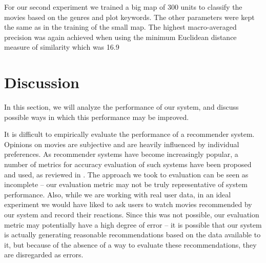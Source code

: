 \documentclass[conference]{IEEEtran}
\begin{document}
For our second experiment we trained a big map of 300 units to classify the movies based on the genres and plot keywords. The other parameters were kept the same as in the training of the small map. The highest macro-averaged precision was again achieved when using the minimum Euclidean distance measure of similarity which was 16.9%


\section{Discussion}
In this section, we will analyze the performance of our system, and discuss possible ways in which this performance may be improved.

It is difficult to empirically evaluate the performance of a recommender system. Opinions on movies are subjective and are heavily influenced by individual preferences. As recommender systems have become increasingly popular, a number of metrics for accuracy evaluation of such systems have been proposed and used, as reviewed in \cite{gunawardana2009survey}. The approach we took to evaluation can be seen as incomplete – our evaluation metric may not be truly representative of system performance. Also, while we are working with real user data, in an ideal experiment we would have liked to ask users to watch movies recommended by our system and record their reactions. Since this was not possible, our evaluation metric may potentially have a high degree of error – it is possible that our system is actually generating reasonable recommendations based on the data available to it, but because of the absence of a way to evaluate these recommendations, they are disregarded as errors.
\end{document}
